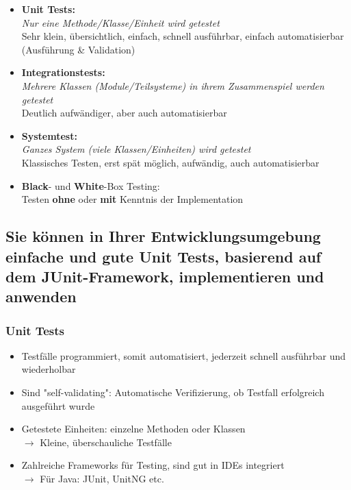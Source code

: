 \documentclass[a4paper]{article}
\begin{document}
		\begin{itemize}
			\item \textbf{Unit Tests:}\\
				\textit{Nur eine Methode/Klasse/Einheit wird getestet}\\
					Sehr klein, übersichtlich, einfach, schnell ausführbar, einfach automatisierbar \\
					(Ausführung \& Validation)
					
			\item \textbf{Integrationstests:}\\
					\textit{Mehrere Klassen (Module/Teilsysteme) in ihrem Zusammenspiel werden getestet}\\
					Deutlich aufwändiger, aber auch automatisierbar
					
			\item \textbf{Systemtest:}\\
					\textit{Ganzes System (viele Klassen/Einheiten) wird getestet}\\
					Klassisches Testen, erst spät möglich, aufwändig, auch automatisierbar
					
			\item \textbf{Black}- und \textbf{White}-Box Testing:\\
					Testen \textbf{ohne} oder \textbf{mit} Kenntnis der Implementation
			
		\end{itemize}
		
		\subsection{Sie können in Ihrer Entwicklungsumgebung einfache und gute Unit Tests, basierend auf dem JUnit-Framework, implementieren und anwenden}
		
			\subsubsection{Unit Tests}
			
			\begin{itemize}
				\item Testfälle programmiert, somit automatisiert, jederzeit schnell ausführbar und wiederholbar
				\item Sind "self-validating": Automatische Verifizierung, ob Testfall erfolgreich ausgeführt wurde
				\item Getestete Einheiten: einzelne Methoden oder Klassen\\
						$\rightarrow$ Kleine, überschauliche Testfälle
				\item Zahlreiche Frameworks für Testing, sind gut in IDEs integriert\\
						$\rightarrow$ Für Java: JUnit, UnitNG etc.
			\end{itemize}
		
\end{document}
